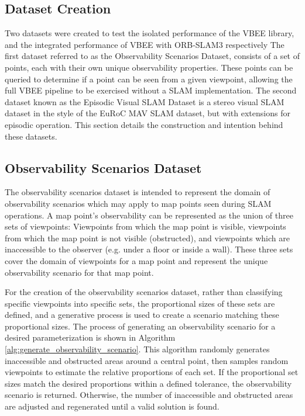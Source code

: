 \subsection{Dataset Creation}
\label{sec:dataset_creation}

Two datasets were created to test the isolated performance of the VBEE library, and the integrated performance of VBEE with ORB-SLAM3 respectively The first dataset referred to as the Observability Scenarios Dataset, consists of a set of points, each with their own unique observability properties. These points can be queried to determine if a point can be seen from a given viewpoint, allowing the full VBEE pipeline to be exercised without a SLAM implementation. The second dataset known as the Episodic Visual SLAM Dataset is a stereo visual SLAM dataset in the style of the EuRoC MAV SLAM dataset, but with extensions for episodic operation. This section details the construction and intention behind these datasets.

\subsection{Observability Scenarios Dataset}
\label{sec:observability_scenario_dataset}
The observability scenarios dataset is intended to represent the domain of observability scenarios which may apply to map points seen during SLAM operations. A map point's observability can be represented as the union of three sets of viewpoints: Viewpoints from which the map point is visible, viewpoints from which the map point is not visible (obstructed), and viewpoints which are inaccessible to the observer (e.g. under a floor or inside a wall). These three sets cover the domain of viewpoints for a map point and represent the unique observability scenario for that map point.

For the creation of the observability scenarios dataset, rather than classifying specific viewpoints into specific sets, the proportional sizes of these sets are defined, and a generative process is used to create a scenario matching these proportional sizes. The process of generating an observability scenario for a desired parameterization is shown in Algorithm \ref{alg:generate_observability_scenario}. This algorithm randomly generates inaccessible and obstructed areas around a central point, then samples random viewpoints to estimate the relative proportions of each set. If the proportional set sizes match the desired proportions within a defined tolerance, the observability scenario is returned. Otherwise, the number of inaccessible and obstructed areas are adjusted and regenerated until a valid solution is found.

